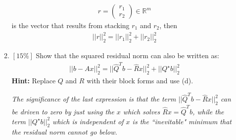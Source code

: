 \documentclass{article}
\begin{document}
\begin{enumerate}
\begin{enumerate}
\begin{eqnarray*}
r=\left(\begin{array}{c}
r_1 \\
r_2
\end{array}
\right)\in\mathbb R^m
\end{eqnarray*}
is the vector that results from stacking $r_1$ and $r_2$, then
\begin{eqnarray*}
||r||^2_2=||r_1||_2^2+||r_2||_2^2
\end{eqnarray*}
\item $[15\%]$ Show that the squared residual norm can also be written as:
\begin{eqnarray*}
||b-Ax||_2^2=||\hat Q^Tb-\hat Rx||_2^2+||Q^\star b||_2^2
\end{eqnarray*}
\textbf{Hint:} Replace $Q$ and $R$ with their block forms and use (d).

\noindent \emph{The significance of the last expression is that the term $||\hat
Q^Tb-\hat Rx||_2^2$ can be driven to zero by just using the $x$ which solves
$\hat Rx=\hat Q^Tb$, while the term $||Q^\star b||_2^2$ which is independent of
$x$ is the ``inevitable" minimum that the residual norm cannot go below.}
\end{enumerate}
\end{enumerate}
\end{document}
